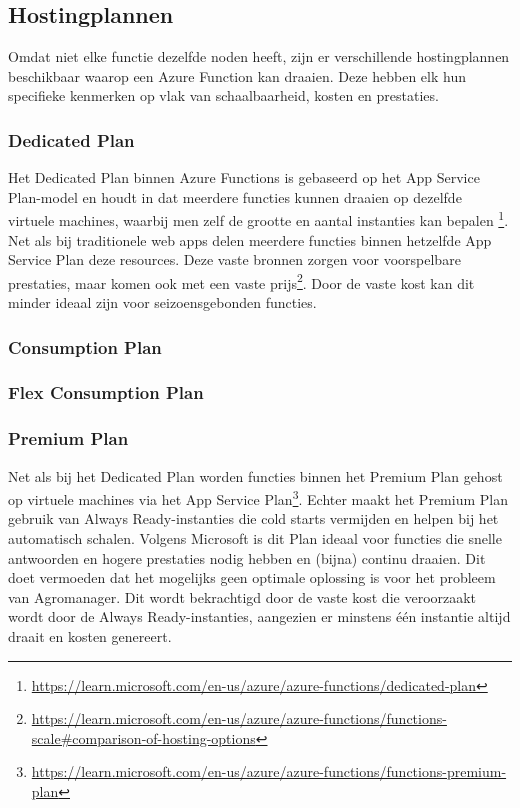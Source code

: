 \subsection{Hostingplannen}

Omdat niet elke functie dezelfde noden heeft, zijn er verschillende hostingplannen beschikbaar waarop een Azure Function kan draaien. Deze hebben elk hun specifieke kenmerken op vlak van schaalbaarheid, kosten en prestaties.

\subsubsection{Dedicated Plan}

Het Dedicated Plan binnen Azure Functions is gebaseerd op het App Service Plan-model en houdt in dat meerdere functies kunnen draaien op dezelfde virtuele machines, waarbij men zelf de grootte en aantal instanties kan bepalen \footnote{\label{af:dedicated-plan}\url{https://learn.microsoft.com/en-us/azure/azure-functions/dedicated-plan}}. Net als bij traditionele web apps delen meerdere functies binnen hetzelfde App Service Plan deze resources. Deze vaste bronnen zorgen voor voorspelbare prestaties, maar komen ook met een vaste prijs\footnote{\label{af:comparison-hosting-options}\url{https://learn.microsoft.com/en-us/azure/azure-functions/functions-scale\#comparison-of-hosting-options}}. Door de vaste kost kan dit minder ideaal zijn voor seizoensgebonden functies. 

\subsubsection{Consumption Plan}

\subsubsection{Flex Consumption Plan}

\subsubsection{Premium Plan}

Net als bij het Dedicated Plan worden functies binnen het Premium Plan gehost op virtuele machines via het App Service Plan\footnote{\label{af:premium-plan}\url{https://learn.microsoft.com/en-us/azure/azure-functions/functions-premium-plan}}. Echter maakt het Premium Plan gebruik van Always Ready-instanties die cold starts vermijden en helpen bij het automatisch schalen. Volgens Microsoft is dit Plan ideaal voor functies die snelle antwoorden en hogere prestaties nodig hebben en (bijna) continu draaien. Dit doet vermoeden dat het mogelijks geen optimale oplossing is voor het probleem van Agromanager. Dit wordt bekrachtigd door de vaste kost die veroorzaakt wordt door de Always Ready-instanties, aangezien er minstens één instantie altijd draait en kosten genereert. 

